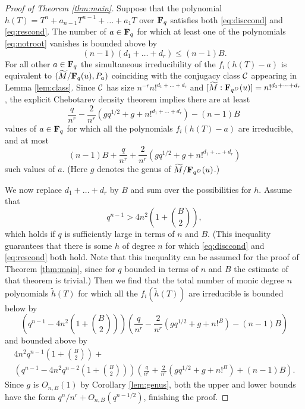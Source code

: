 \documentclass[a4paper]{compositio}
\begin{document}
\begin{proof}[Proof of Theorem \ref{thm:main}] Suppose that the polynomial
$h(T) = T^n + a_{n-1}T^{n-1} + \dots + a_1 T$ over $\mathbf{F}_q$ satisfies
both \eqref{eq:disccond} and \eqref{eq:rescond}. The number of $a
\in \mathbf{F}_q$ for which at least one of the polynomials
\eqref{eq:notroot} vanishes is bounded above by
\[ (n-1)(d_1 + \dots + d_r) \leq (n-1)B. \] For all other $a \in \mathbf{F}_q$ the
simultaneous irreducibility of the $f_i(h(T)-a)$ is equivalent to
$(\widetilde{M}/\mathbf{F}_q(u), P_a)$ coinciding with the conjugacy class
$\mathcal{C}$ appearing in Lemma \ref{lem:class}. Since $\mathcal{C}$ has size $n^{-r}
n!^{d_1+\dots + d_r}$ and $[\widetilde{M}:\mathbf{F}_{q^D}(u)] =
n!^{d_1+\dots+d_r}$, the explicit Chebotarev density theorem implies
there are at least
\[
\frac{q}{n^r} - \frac{2}{n^r}\left(g q^{1/2} + g+
n!^{d_1+\dots+d_r}\right)-(n-1) B\
\] values of $a \in \mathbf{F}_q$ for which all the polynomials $f_i(h(T)-a)$ are
irreducible, and at most \[(n-1) B + \frac{q}{n^r} +
\frac{2}{n^r}\left(g q^{1/2} + g+ n!^{d_1+\dots+d_r}\right)
\]
such values of $a$. (Here $g$ denotes the genus of
$\widetilde{M}/\mathbf{F}_{q^D}(u)$.)

We now replace $d_1+\dots+d_r$ by $B$ and sum over the possibilities
for $h$. Assume that
\[ q^{n-1} > 4n^2 \left(1 + \binom{B}{2}\right), \]
which holds if $q$ is sufficiently large in terms of $n$ and $B$.
(This inequality guarantees that there is some $h$ of degree $n$ for
which \eqref{eq:disccond} and \eqref{eq:rescond} both hold. Note
that this inequality can be assumed for the proof of Theorem
\ref{thm:main}, since for $q$ bounded in terms of $n$ and $B$ the
estimate of that theorem is trivial.) Then we find that the total
number of monic degree $n$ polynomials $\widetilde{h}(T)$ for which
all the $f_i(\widetilde{h}(T))$ are irreducible is bounded below by
\begin{equation}\label{eq:lower}
\left(q^{n-1} - 4n^2 \left(1 + \binom{B}{2}\right)\right)\left(\frac{q}{n^r} - \frac{2}{n^r}\left(g q^{1/2} + g+ n!^{B}\right) - (n-1)B\right)
\end{equation}
and bounded above by
\begin{multline*} 4n^2 q^{n-1} \left(1 + \binom{B}{2}\right) + \\
\left(q^{n-1} - 4n^2 q^{n-2}\left(1 +
\binom{B}{2}\right)\right)\left(\frac{q}{n^r} +\frac{2}{n^r}\left(g
q^{1/2} + g+ n!^{B}\right)+ (n-1)B \right).
\end{multline*}
Since $g$ is $O_{n,B}(1)$ by Corollary \ref{lem:genus}, both the
upper and lower bounds have the form $q^n/n^r + O_{n,B}(q^{n-1/2})$,
finishing the proof.
\end{proof}
\end{document}
